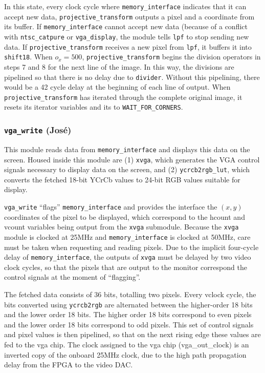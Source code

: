 \documentclass[10pt]{article}
\begin{document}
In this state, every clock cycle where {\tt memory\_interface} indicates that it can accept new data, {\tt projective\_transform} outputs a pixel and a coordinate from its buffer. If {\tt memory\_interface} cannot accept new data (because of a conflict with {\tt ntsc\_catpure} or {\tt vga\_display}, the module tells {\tt lpf} to stop sending new data. If {\tt projective\_transform} receives a new pixel from {\tt lpf}, it buffers it into {\tt shift18}. When $o_x = 500$, {\tt projective\_transform} begins the division operators in steps 7 and 8 for the next line of the image. In this way, the divisions are pipelined so that there is no delay due to {\tt divider}. Without this pipelining, there would be a 42 cycle delay at the beginning of each line of output. When {\tt projective\_transform} has iterated through the complete original image, it resets its iterator variables and its to {\tt WAIT\_FOR\_CORNERS}.

\subsubsection{{\tt vga\_write} (Jos\'{e})}
This module reads data from {\tt memory\_interface} and displays this data on the screen. Housed inside this module are (1) {\tt xvga}, which generates the VGA control signals necessary to display data on the screen, and (2) {\tt ycrcb2rgb\_lut}, which converts the fetched 18-bit YCrCb values to 24-bit RGB values suitable for display.

{\tt vga\_write} ``flags'' {\tt memory\_interface} and provides the interface the $(x,y)$ coordinates of the pixel to be displayed, which correspond to the hcount and vcount variables being output from the {\tt xvga} submodule. Because the {\tt xvga} module is clocked at 25MHz and {\tt memory\_interface} is clocked at 50MHz, care must be taken when requesting and reading pixels. Due to the implicit four-cycle delay of {\tt memory\_interface}, the outputs of {\tt xvga} must be delayed by two video clock cycles, so that the pixels that are output to the monitor correspond the control signals at the moment of ``flagging''. 

The fetched data consists of 36 bits, totalling two pixels. Every vclock cycle, the bits converted using {\tt ycrcb2rgb} are alternated between the higher-order 18 bits and the lower order 18 bits. The higher order 18 bits correspond to even pixels and the lower order 18 bits correspond to odd pixels. This set of control signals and pixel values is then pipelined, so that on the next rising edge these values are fed to the vga chip. The clock assigned to the vga chip (vga\_out\_clock) is an inverted copy of the onboard 25MHz clock, due to the high path propagation delay from the FPGA to the video DAC.
\end{document}
